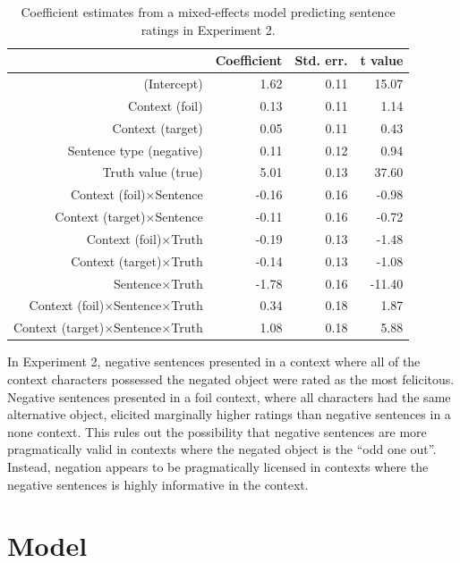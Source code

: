 \documentclass[10pt,letterpaper]{article}
\begin{document}
\begin{table}[t]
\caption{\label{tab:s2} Coefficient estimates from a mixed-effects model predicting sentence ratings in Experiment 2.}
\begin{center}
\small\addtolength{\tabcolsep}{-5pt}
\begin{tabular}{rrrr}
  \hline
 & Coefficient & Std. err. & t value \\ 
  \hline
(Intercept) & 1.62 & 0.11 & 15.07 \\ 
  Context (foil) & 0.13 & 0.11 & 1.14  \\ 
  Context (target) & 0.05 & 0.11 & 0.43  \\ 
  Sentence type (negative) & 0.11 & 0.12 & 0.94 \\
  Truth value (true) & 5.01 & 0.13 & 37.60 \\ 
  Context (foil)$\times$Sentence & -0.16 & 0.16 & -0.98 \\
  Context (target)$\times$Sentence & -0.11 & 0.16 & -0.72 \\
  Context (foil)$\times$Truth & -0.19 & 0.13 & -1.48 \\
  Context (target)$\times$Truth & -0.14 & 0.13 & -1.08 \\
  Sentence$\times$Truth & -1.78 & 0.16 & -11.40 \\
  Context (foil)$\times$Sentence$\times$Truth& 0.34 & 0.18 & 1.87 \\
  Context (target)$\times$Sentence$\times$Truth & 1.08 & 0.18 & 5.88 \\
   \hline
\end{tabular}
\end{center}
\end{table}

In Experiment 2, negative sentences presented in a context where all of the context characters possessed the negated object were rated as the most felicitous.  Negative sentences presented in a foil context, where all characters had the same alternative object, elicited marginally higher ratings than negative sentences in a none context.  This rules out the possibility that negative sentences are more pragmatically valid in contexts where the negated object is the ``odd one out''.  Instead, negation appears to be pragmatically licensed in contexts where the negative sentences is highly informative in the context.  

\section{Model}
\end{document}
